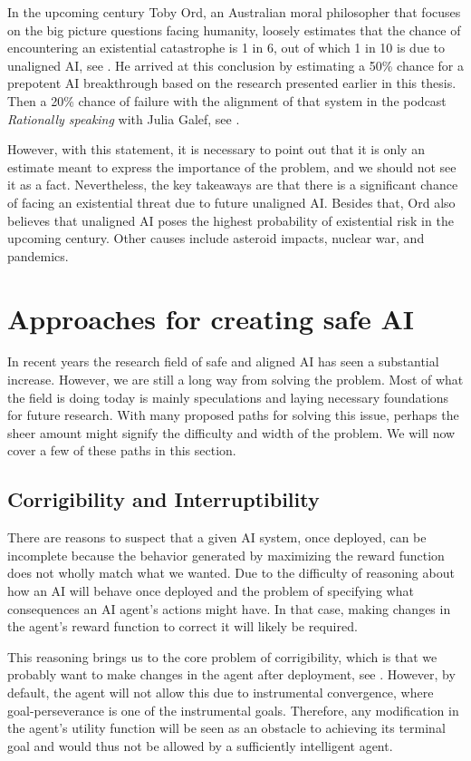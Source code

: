\documentclass[12pt,A4]{report}
\theoremstyle{definition}
\begin{document}
In the upcoming century Toby Ord, an Australian moral philosopher that focuses on the big picture questions facing humanity, loosely estimates that the chance of encountering an existential catastrophe is 1 in 6, out of which 1 in 10 is due to unaligned  AI, see \citet[c.6]{Precipice}. He arrived at this conclusion by estimating a 50\% chance for a prepotent AI breakthrough based on the research presented earlier in this thesis. Then a 20\% chance of failure with the alignment of that system in the podcast \textit{Rationally speaking} with Julia Galef, see \citet[26:15]{RationallySpeaking}. 

However, with this statement, it is necessary to point out that it is only an estimate meant to express the importance of the problem, and we should not see it as a fact. Nevertheless, the key takeaways are that there is a significant chance of facing an existential threat due to future unaligned AI. Besides that, Ord also believes that unaligned AI poses the highest probability of existential risk in the upcoming century. Other causes include asteroid impacts, nuclear war, and pandemics. 


\section{Approaches for creating safe AI}
In recent years the research field of safe and aligned AI has seen a substantial increase. However, we are still a long way from solving the problem. Most of what the field is doing today is mainly speculations and laying necessary foundations for future research. With many proposed paths for solving this issue, perhaps the sheer amount might signify the difficulty and width of the problem. We will now cover a few of these paths in this section.


\subsection{Corrigibility and Interruptibility }
There are reasons to suspect that a given AI system, once deployed, can be incomplete because the behavior generated by maximizing the reward function does not wholly match what we wanted. Due to the difficulty of reasoning about how an AI will behave once deployed and the problem of specifying what consequences an AI agent's actions might have. In that case, making changes in the agent's reward function to correct it will likely be required.  

This reasoning brings us to the core problem of corrigibility, which is that we probably want to make changes in the agent after deployment, see \citet{Corrigibility}. However, by default, the agent will not allow this due to instrumental convergence, where goal-perseverance is one of the instrumental goals. Therefore, any modification in the agent's utility function will be seen as an obstacle to achieving its terminal goal and would thus not be allowed by a sufficiently intelligent agent. 
\end{document}
